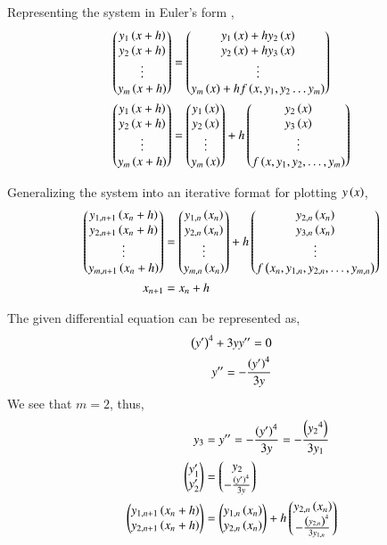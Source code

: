 \documentclass[journal]{IEEEtran}
\begin{document}
Representing the system in Euler's form ,
\begin{align}
    \begin{pmatrix}y_1\left(x + h\right)\\y_2\left(x + h\right)\\\vdots\\y_m\left(x + h\right)\end{pmatrix} &= \begin{pmatrix}y_1\left(x\right) + hy_2\left(x\right)\\y_2\left(x\right) + hy_3\left(x\right)\\\vdots\\y_m\left(x\right) + hf\left(x, y_1, y_2 \dots y_m\right)\end{pmatrix}\\
    \begin{pmatrix}y_1\left(x + h\right)\\y_2\left(x + h\right)\\\vdots\\y_m\left(x + h\right)\end{pmatrix} &= \begin{pmatrix}y_1\left(x\right)\\y_2\left(x\right)\\\vdots\\y_m\left(x\right)\end{pmatrix} + h\begin{pmatrix}y_2\left(x\right)\\y_3\left(x\right)\\\vdots\\f\left(x, y_1, y_2, \dots, y_m\right)\end{pmatrix} 
\end{align}

Generalizing the system into an iterative format for plotting $y\left(x\right)$,
\begin{align}
    \begin{pmatrix}y_{1, n + 1}\left(x_n + h\right)\\y_{2, n + 1}\left(x_n + h\right)\\\vdots\\y_{m, n + 1}\left(x_n + h\right)\end{pmatrix} &= \begin{pmatrix}y_{1, n}\left(x_n\right)\\y_{2, n}\left(x_n\right)\\\vdots\\y_{m, n} \left(x_n\right)\end{pmatrix} + h\begin{pmatrix}y_{2, n}\left(x_n\right)\\y_{3, n}\left(x_n\right)\\\vdots\\f\left(x_n, y_{1, n}, y_{2, n}, \dots, y_{m, n}\right)\end{pmatrix}\\
    x_{n + 1} &= x_{n} + h
\end{align}

The given differential equation can be represented as,
\begin{align}
    \left(y^{\prime}\right)^4 + 3yy^{\prime\prime} = 0\\
    y^{\prime\prime} = -\frac{\left(y^{\prime}\right)^4}{3y}
\end{align}
We see that $m = 2$, thus,
\begin{align}
    y_3 &= y^{\prime\prime} = -\frac{\left(y^{\prime}\right)^4}{3y} = -\frac{\left({y_2}^4\right)}{3y_1}\\
    \begin{pmatrix}y_1^{\prime}\\y_2^{\prime}\end{pmatrix} &= \begin{pmatrix}y_2\\-\frac{\left(y^{\prime}\right)^4}{3y}\end{pmatrix}\\
    \begin{pmatrix}y_{1, n + 1}\left(x_n + h\right)\\y_{2, n + 1}\left(x_n + h\right)\end{pmatrix} &= \begin{pmatrix}y_{1, n}\left(x_n\right)\\y_{2, n}\left(x_n\right)\end{pmatrix} + h\begin{pmatrix}y_{2, n}\left(x_n\right)\\-\frac{\left(y_{2, n}\right)^4}{3y_{1, n}}\end{pmatrix} 
\end{align}
\end{document}
